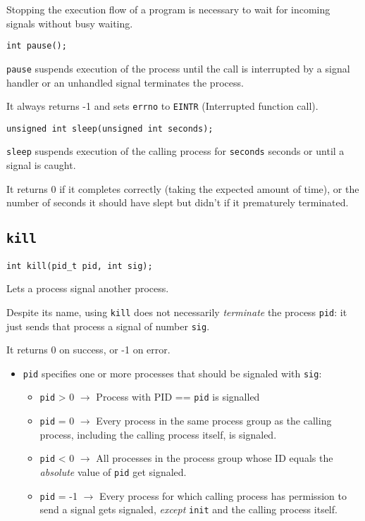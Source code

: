 \documentclass{article}
\begin{document}
Stopping the execution flow of a program is necessary to wait for incoming signals without busy waiting.

\begin{verbatim}
int pause();
\end{verbatim}

\texttt{pause} suspends execution of the process until the call is interrupted by a signal handler or an unhandled signal terminates the process.

It always returns -1 and sets \texttt{errno} to \texttt{EINTR} (Interrupted function call).

\begin{verbatim}
unsigned int sleep(unsigned int seconds);
\end{verbatim}

\texttt{sleep} suspends execution of the calling process for \texttt{seconds} seconds or until a signal is caught.

It returns 0 if it completes correctly (taking the expected amount of time), or the number of seconds it should have slept but didn't if it prematurely terminated.


\subsection{\texttt{kill}}

\begin{verbatim}
int kill(pid_t pid, int sig);
\end{verbatim}

Lets a process signal another process.

Despite its name, using \texttt{kill} does not necessarily \textit{terminate} the process \texttt{pid}: it just sends that process a signal of number \texttt{sig}.

It returns 0 on success, or -1 on error.

\begin{itemize}
    \item \texttt{pid} specifies one or more processes that should be signaled with \texttt{sig}:
        \begin{itemize}
            \item \texttt{pid} > 0 $\rightarrow$ Process with PID == \texttt{pid} is signalled
            \item \texttt{pid} = 0 $\rightarrow$ Every process in the same process group as the calling process, including the calling process itself, is signaled.
            \item \texttt{pid} < 0 $\rightarrow$ All processes in the process group whose ID equals the \textit{absolute} value of \texttt{pid} get signaled.
            \item \texttt{pid} = -1 $\rightarrow$ Every process for which calling process has permission to send a signal gets signaled, \textit{except} \texttt{init} and the calling process itself.
        \end{itemize}
\end{itemize}
\end{document}

